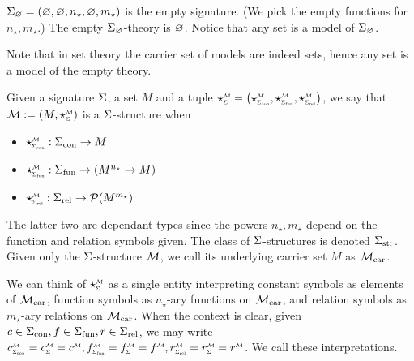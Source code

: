 \begin{eg}
    $\Sigma_\varnothing = (\varnothing, \varnothing, n_\star, \varnothing, m_\star)$ 
    is the empty signature.
    (We pick the empty functions for $n_\star, m_\star$.)
    The empty $\Sigma_\varnothing$-theory is $\varnothing$.
    Notice that any set is a model of $\Sigma_\varnothing$.
\end{eg}
Note that in set theory the carrier set of models are indeed sets,
hence any set is a model of the empty theory.

\begin{dfn}
    Given a signature $\Sigma$, a set $M$ and a tuple 
    $\intp{\Si}{\MM} = 
    \brkt{\intp{\const{\Si}}{\MM}, 
    \intp{\func{\Si}}{\MM}, \intp{\rel{\Si}}{\MM}}$, 
    we say that $\MM := (M, \intp{\Si}{\MM})$ is a $\Sigma$-structure when 
    \begin{itemize}
        \item $\intp{\const{\Si}}{\MM} : \const{\Si} \to M$
        \item $\intp{\func{\Si}}{\MM} : \func{\Si} \to (M^{n_\star} \to M)$
        \item $\intp{\rel{\Si}}{\MM} : \rel{\Si} \to \PP(M^{m_{\star}})$
    \end{itemize}
    The latter two are dependant types since the powers
    $n_\star, m_\star$ 
    depend on the function and relation symbols given.
    The class of $\Sigma$-structures is denoted ${\Sigma}_\mathrm{str}$.
    Given only the $\Sigma$-structure $\mathcal{M}$, 
    we call its underlying carrier set $M$ as ${\mathcal{M}}_\mathrm{car}$.
\end{dfn}
We can think of $\intp{\Si}{\MM}$
as a single entity interpreting constant symbols as elements of ${\mathcal{M}}_\mathrm{car}$,
function symbols as $n_{\star}$-ary functions on ${\mathcal{M}}_\mathrm{car}$,
and relation symbols as $m_{\star}$-ary relations on ${\mathcal{M}}_\mathrm{car}$.
When the context is clear,
given $c \in {\Sigma}_\mathrm{con}, f \in {\Sigma}_\mathrm{fun}, r \in {\Sigma}_\mathrm{rel}$, 
we may write 
$\subintp{\const{\Si}}{\MM}{c} = \subintp{\Si}{\MM}{c} = \modintp{\MM}{c}, 
\subintp{\func{\Si}}{\MM}{f} = \subintp{\Si}{\MM}{f}  = \modintp{\MM}{f}, 
\subintp{\rel{\Si}}{\MM}{r} = \subintp{\Si}{\MM}{r}  = \modintp{\MM}{r}$.
We call these interpretations.


